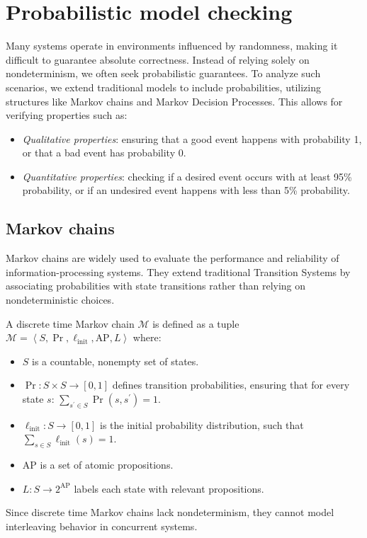 \section{Probabilistic model checking}

Many systems operate in environments influenced by randomness, making it difficult to guarantee absolute correctness.
Instead of relying solely on nondeterminism, we often seek probabilistic guarantees.
To analyze such scenarios, we extend traditional models to include probabilities, utilizing structures like Markov chains and Markov Decision Processes. 
This allows for verifying properties such as:
\begin{itemize}
    \item \textit{Qualitative properties}: ensuring that a good event happens with probability 1, or that a bad event has probability 0.
    \item \textit{Quantitative properties}: checking if a desired event occurs with at least 95\% probability, or if an undesired event happens with less than 5\% probability.
\end{itemize}

\subsection{Markov chains}
Markov chains are widely used to evaluate the performance and reliability of information-processing systems. 
They extend traditional Transition Systems by associating probabilities with state transitions rather than relying on nondeterministic choices.
\begin{definition}
    A discrete time Markov chain $\mathcal{M}$ is defined as a tuple $\mathcal{M}=\left\langle S,\Pr,\ell_{\text{init}},\text{AP},L\right\rangle$ where: 
    \begin{itemize}
        \item $S$ is a countable, nonempty set of states.
        \item $\Pr : S \times S \rightarrow [0, 1]$ defines transition probabilities, ensuring that for every state $s$: $\sum_{s^\prime\in S}\Pr(s,s^\prime)=1$. 
        \item $\ell_{\text{init}}:S\rightarrow [0,1]$ is the initial probability distribution, such that $\sum_{s\in S}\ell_{\text{init}}(s)=1$.
        \item $\text{AP}$ is a set of atomic propositions.
        \item $L : S \rightarrow 2^{\text{AP}}$ labels each state with relevant propositions.
    \end{itemize}
\end{definition}
\noindent Since discrete time Markov chains lack nondeterminism, they cannot model interleaving behavior in concurrent systems.

